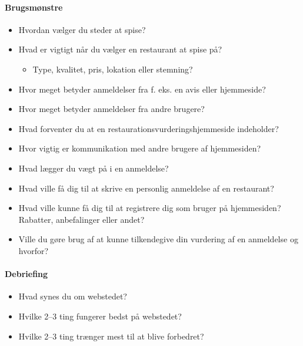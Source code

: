 \documentclass[a4paper, 12pt]{article}
\begin{document}
\paragraph{Brugsmønstre}
\begin{itemize}
\item Hvordan vælger du steder at spise?
\item Hvad er vigtigt når du vælger en restaurant at spise på?
  \begin{itemize}
  \item Type, kvalitet, pris, lokation eller stemning?
  \end{itemize}
\item Hvor meget betyder anmeldelser fra f. eks. en avis eller hjemmeside?
\item Hvor meget betyder anmeldelser fra andre brugere?
\item Hvad forventer du at en restaurationsvurderingshjemmeside indeholder?
\item Hvor vigtig er kommunikation med andre brugere af hjemmesiden?
\item Hvad lægger du vægt på i en anmeldelse?
\item Hvad ville få dig til at skrive en personlig anmeldelse af en restaurant?
\item Hvad ville kunne få dig til at registrere dig som bruger på hjemmesiden?
Rabatter, anbefalinger eller andet?
\item Ville du gøre brug af at kunne tilkendegive din vurdering af en anmeldelse
og hvorfor?
\end{itemize}

\paragraph{Debriefing}
\begin{itemize}
\item Hvad synes du om webstedet?
\item Hvilke 2--3 ting fungerer bedst på webstedet?
\item Hvilke 2--3 ting trænger mest til at blive forbedret?
\end{itemize}

\printbibliography[heading=bibnumbered,title=Litteraturliste]
\end{document}
